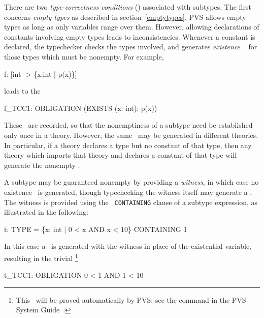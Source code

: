 
There are two \emph{type-correctness conditions} (\tccs) associated with
subtypes.  The first concerns \emph{empty types} as described in section~\ref{emptytypes}.  PVS
allows empty types as long as only variables range over them.  However,
allowing declarations of constants involving empty types leads to
inconsistencies.  Whenever a constant is declared, the typechecker checks
the types involved, and generates \emph{ existence} \tccs\  for those types which must be nonempty.  For
example,
%
\begin{pvsex}
  f: [int -> \{x:int | p(x)\}]
\end{pvsex}
leads to the \tcc\
\begin{pvsex}
  f_TCC1: OBLIGATION (EXISTS (x: int): p(x))
\end{pvsex}
These \tccs\ are recorded, so that the nonemptiness of a subtype need
be established only once in a theory.  However, the same \tcc\ may be
generated in different theories.  In particular, if a theory declares a
type but no constant of that type, then any theory which imports that
theory and declares a constant of that type will generate the nonempty
\tcc.  

A subtype may be guaranteed nonempty by providing a
\emph{witness}, in which case no existence \tcc\ is
generated, though typechecking the witness itself may generate a \tcc.
The witness is provided using the {\tt
CONTAINING} clause of a subtype
expression, as illustrated in the following:
\begin{pvsex}
  t: TYPE = \{x: int | 0 < x AND x < 10\} CONTAINING 1
\end{pvsex}
In this case a \tcc\ is generated with the witness in place of the
existential variable, resulting in the trivial \tcc\footnote{This \tcc\
will be proved automatically by PVS; see the
\cmd{typecheck-prove} command in the PVS System Guide~\cite{PVS:userguide}.}
\begin{pvsex}
  t_TCC1: OBLIGATION 0 < 1 AND 1 < 10
\end{pvsex}

